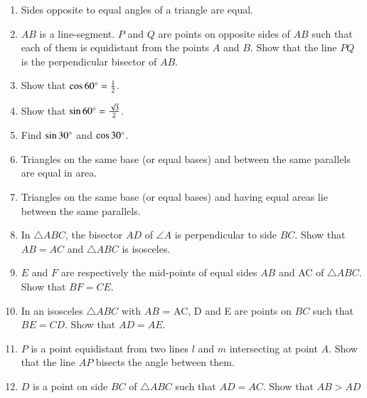 \begin{enumerate}[label=\thesection.\arabic*.,ref=\thesection.\theenumi]
\item  Sides opposite to equal angles of a triangle are equal. 
\\
\solution

%
\item $AB$ is a line-segment. $P$ and $Q$ are points on opposite sides of $AB$ such that each of them is equidistant from the points $A$ and $B$. Show that the line $PQ $ is the perpendicular bisector of $AB$.
%
\item Show that $\cos 60\degree = \frac{1}{2} $.  
\\
\solution

\item Show that $\sin 60\degree = \frac{\sqrt{3}}{2} $.
\\
\solution

\item Find  $\sin 30\degree$ and  $\cos 30\degree$.
\item Triangles on the same base (or equal bases) and between the same parallels are equal in area.
\\
\solution

\item Triangles on the same base (or equal bases) and having equal areas lie between the same parallels.
\item In $\triangle ABC$, the bisector $AD$ of $\angle  A$ is perpendicular to side $BC$. Show that $AB = AC$ and $\triangle ABC$ is isosceles.
\item $E$ and $F$ are respectively the mid-points of equal sides $AB$ and AC of $\triangle ABC$. Show that $BF = CE$. 
\item In an isosceles $\triangle ABC$ with $AB$ = AC, D and E are points on $BC$ such that $BE = CD$. Show that $AD = AE$. 
%
%
\item $P$ is a point equidistant from two lines $l$ and $m$ intersecting at point $A$.  Show that the line  $AP$  bisects the angle between them.
%
\item $D$ is a point on side $BC$ of $\triangle  ABC$ such that $AD = AC$. Show that $AB > AD$
\\
\solution



\end{enumerate}

